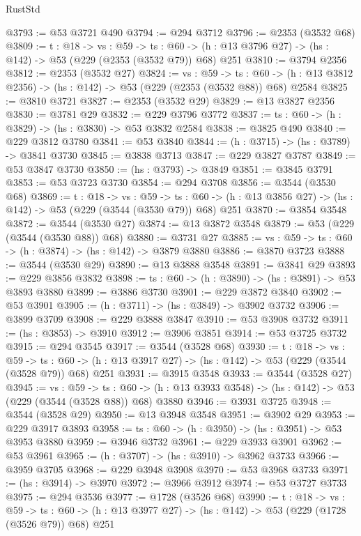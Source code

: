 \begin{lexlean}{RustStd}
\begin{coremodule}
@3793 := @53 @3721 @490
@3794 := @294 @3712
@3796 := @2353 (@3532 @68)
@3809 := {t : @18} ->
  {vs : @59} ->
  {ts : @60} -> (h : @13 @3796 @27) -> (hs : @142) -> @53 (@229 (@2353 (@3532 @79)) @68) @251
@3810 := @3794 @2356
@3812 := @2353 (@3532 @27)
@3824 := {vs : @59} ->
  {ts : @60} -> (h : @13 @3812 @2356) -> (hs : @142) -> @53 (@229 (@2353 (@3532 @88)) @68) @2584
@3825 := @3810 @3721
@3827 := @2353 (@3532 @29)
@3829 := @13 @3827 @2356
@3830 := @3781 @29
@3832 := @229 @3796 @3772
@3837 := {ts : @60} -> (h : @3829) -> (hs : @3830) -> @53 @3832 @2584
@3838 := @3825 @490
@3840 := @229 @3812 @3780
@3841 := @53 @3840
@3844 := (h : @3715) -> (hs : @3789) -> @3841 @3730
@3845 := @3838 @3713
@3847 := @229 @3827 @3787
@3849 := @53 @3847 @3730
@3850 := (hs : @3793) -> @3849
@3851 := @3845 @3791
@3853 := @53 @3723 @3730
@3854 := @294 @3708
@3856 := @3544 (@3530 @68)
@3869 := {t : @18} ->
  {vs : @59} ->
  {ts : @60} -> (h : @13 @3856 @27) -> (hs : @142) -> @53 (@229 (@3544 (@3530 @79)) @68) @251
@3870 := @3854 @3548
@3872 := @3544 (@3530 @27)
@3874 := @13 @3872 @3548
@3879 := @53 (@229 (@3544 (@3530 @88)) @68)
@3880 := @3731 @27
@3885 := {vs : @59} -> {ts : @60} -> (h : @3874) -> (hs : @142) -> @3879 @3880
@3886 := @3870 @3723
@3888 := @3544 (@3530 @29)
@3890 := @13 @3888 @3548
@3891 := @3841 @29
@3893 := @229 @3856 @3832
@3898 := {ts : @60} -> (h : @3890) -> (hs : @3891) -> @53 @3893 @3880
@3899 := @3886 @3730
@3901 := @229 @3872 @3840
@3902 := @53 @3901
@3905 := (h : @3711) -> (hs : @3849) -> @3902 @3732
@3906 := @3899 @3709
@3908 := @229 @3888 @3847
@3910 := @53 @3908 @3732
@3911 := (hs : @3853) -> @3910
@3912 := @3906 @3851
@3914 := @53 @3725 @3732
@3915 := @294 @3545
@3917 := @3544 (@3528 @68)
@3930 := {t : @18} ->
  {vs : @59} ->
  {ts : @60} -> (h : @13 @3917 @27) -> (hs : @142) -> @53 (@229 (@3544 (@3528 @79)) @68) @251
@3931 := @3915 @3548
@3933 := @3544 (@3528 @27)
@3945 := {vs : @59} ->
  {ts : @60} -> (h : @13 @3933 @3548) -> (hs : @142) -> @53 (@229 (@3544 (@3528 @88)) @68) @3880
@3946 := @3931 @3725
@3948 := @3544 (@3528 @29)
@3950 := @13 @3948 @3548
@3951 := @3902 @29
@3953 := @229 @3917 @3893
@3958 := {ts : @60} -> (h : @3950) -> (hs : @3951) -> @53 @3953 @3880
@3959 := @3946 @3732
@3961 := @229 @3933 @3901
@3962 := @53 @3961
@3965 := (h : @3707) -> (hs : @3910) -> @3962 @3733
@3966 := @3959 @3705
@3968 := @229 @3948 @3908
@3970 := @53 @3968 @3733
@3971 := (hs : @3914) -> @3970
@3972 := @3966 @3912
@3974 := @53 @3727 @3733
@3975 := @294 @3536
@3977 := @1728 (@3526 @68)
@3990 := {t : @18} ->
  {vs : @59} ->
  {ts : @60} -> (h : @13 @3977 @27) -> (hs : @142) -> @53 (@229 (@1728 (@3526 @79)) @68) @251

\end{coremodule}
\end{lexlean}
